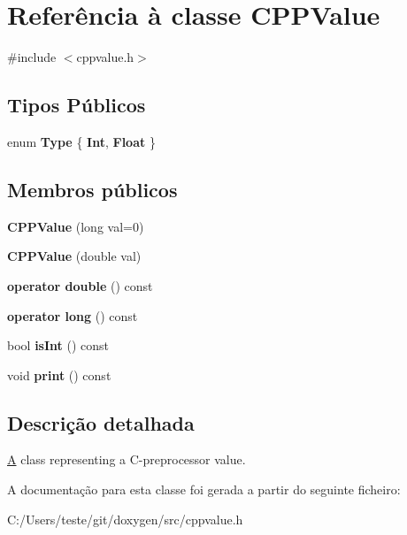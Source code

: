 \hypertarget{class_c_p_p_value}{\section{Referência à classe C\-P\-P\-Value}
\label{class_c_p_p_value}
}


{\ttfamily \#include $<$cppvalue.\-h$>$}

\subsection*{Tipos Públicos}
\begin{DoxyCompactItemize}
\item 
enum {\bfseries Type} \{ {\bfseries Int}, 
{\bfseries Float}
 \}
\end{DoxyCompactItemize}
\subsection*{Membros públicos}
\begin{DoxyCompactItemize}
\item 
\hypertarget{class_c_p_p_value_ab8603ca1ecadcfaeda73aec07d7a4fde}{{\bfseries C\-P\-P\-Value} (long val=0)}\label{class_c_p_p_value_ab8603ca1ecadcfaeda73aec07d7a4fde}

\item 
\hypertarget{class_c_p_p_value_ad4bdf5d22cb0db3d92eb381d58bb44bb}{{\bfseries C\-P\-P\-Value} (double val)}\label{class_c_p_p_value_ad4bdf5d22cb0db3d92eb381d58bb44bb}

\item 
\hypertarget{class_c_p_p_value_a5665dbc337111463ad23d3dba99f7ce3}{{\bfseries operator double} () const }\label{class_c_p_p_value_a5665dbc337111463ad23d3dba99f7ce3}

\item 
\hypertarget{class_c_p_p_value_a20a235a3b8231d8f92c779347fc8eb76}{{\bfseries operator long} () const }\label{class_c_p_p_value_a20a235a3b8231d8f92c779347fc8eb76}

\item 
\hypertarget{class_c_p_p_value_a8a77824300838e6bce0461cbe181de0f}{bool {\bfseries is\-Int} () const }\label{class_c_p_p_value_a8a77824300838e6bce0461cbe181de0f}

\item 
\hypertarget{class_c_p_p_value_a3a3ab31c19c38fe926198ddc4a0a4a91}{void {\bfseries print} () const }\label{class_c_p_p_value_a3a3ab31c19c38fe926198ddc4a0a4a91}

\end{DoxyCompactItemize}


\subsection{Descrição detalhada}
\hyperlink{class_a}{A} class representing a C-\/preprocessor value. 

A documentação para esta classe foi gerada a partir do seguinte ficheiro\-:\begin{DoxyCompactItemize}
\item 
C\-:/\-Users/teste/git/doxygen/src/cppvalue.\-h\end{DoxyCompactItemize}
